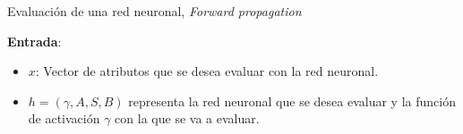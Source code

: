   \begin{algorithm}[H]
    \caption{Evaluación de una red neuronal, \textit{Forward propagation}}
    \label{algoritmo:evaluar red neuronal}

    \hspace*{\algorithmicindent} 
        \textbf{Entrada}:
        \begin{itemize}
            \item $x$: Vector de atributos que se desea evaluar con la red neuronal.
            \item $h = (\gamma, A, S, B)$ representa la red neuronal que se desea evaluar y la función de activación $\gamma$ con la que se va a evaluar. 
        \end{itemize}
        \hspace{\algorithmicindent} 
  \end{algorithm}
  \newpage






